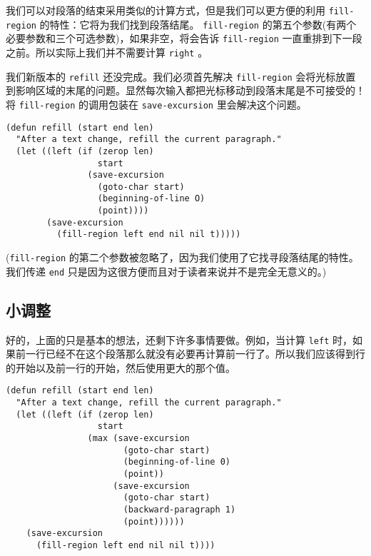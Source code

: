 我们可以对段落的结束采用类似的计算方式，但是我们可以更方便的利用 \texttt{fill-region} 的特性：它将为我们找到段落结尾。 \texttt{fill-region} 的第五个参数(有两个必要参数和三个可选参数)，如果非空，将会告诉 \texttt{fill-region} 一直重排到下一段之前。所以实际上我们并不需要计算 \texttt{right} 。

我们新版本的 \texttt{refill} 还没完成。我们必须首先解决 \texttt{fill-region} 会将光标放置到影响区域的末尾的问题。显然每次输入都把光标移动到段落末尾是不可接受的！将 \texttt{fill-region} 的调用包装在 \texttt{save-excursion} 里会解决这个问题。

\begin{verbatim}
(defun refill (start end len)
  "After a text change, refill the current paragraph."
  (let ((left (if (zerop len)
                  start
                (save-excursion
                  (goto-char start)
                  (beginning-of-line O)
                  (point))))
        (save-excursion
          (fill-region left end nil nil t)))))
\end{verbatim}

(\texttt{fill-region} 的第二个参数被忽略了，因为我们使用了它找寻段落结尾的特性。我们传递 \texttt{end} 只是因为这很方便而且对于读者来说并不是完全无意义的。)

\subsection{小调整}
\label{section:07-Minor-Adjustments}

好的，上面的只是基本的想法，还剩下许多事情要做。例如，当计算 \texttt{left} 时，如果前一行已经不在这个段落那么就没有必要再计算前一行了。所以我们应该得到行的开始以及前一行的开始，然后使用更大的那个值。

\begin{verbatim}
(defun refill (start end len)
  "After a text change, refill the current paragraph."
  (let ((left (if (zerop len)
                  start
                (max (save-excursion
                       (goto-char start)
                       (beginning-of-line 0)
                       (point))
                     (save-excursion
                       (goto-char start)
                       (backward-paragraph 1)
                       (point))))))
    (save-excursion
      (fill-region left end nil nil t))))
\end{verbatim}

